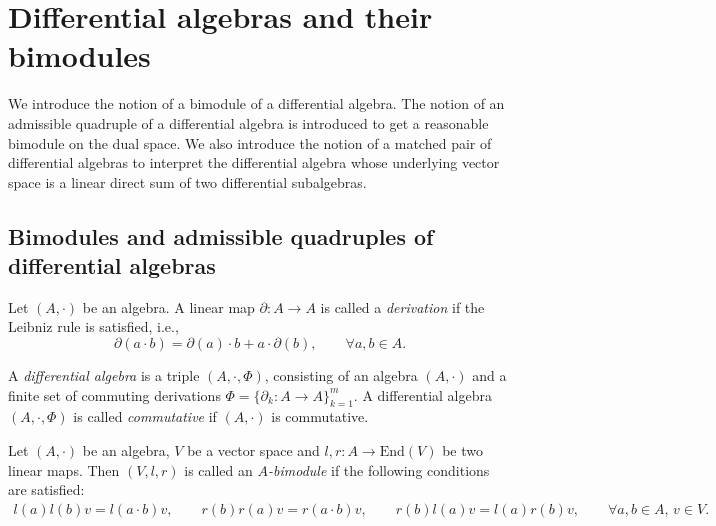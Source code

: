 \documentclass[pdftex]{sigma}
\numberwithin{equation}{section}
\newcommand{\End}{\mathrm{End}}
\begin{document}
\section{Differential algebras and their bimodules}\label{sec:rep}

We introduce the notion of a bimodule of a differential algebra.
The notion of an admissible quadruple of a differential algebra is introduced to get a reasonable bimodule on the dual space.
We also introduce the notion of a matched pair of differential algebras to interpret the differential algebra whose underlying vector space is a linear direct sum of two differential subalgebras.

\subsection{Bimodules and admissible quadruples of differential algebras}

\begin{Definition}\label{def:derivation}
 Let $(A, \cdot)$ be an algebra.
 A linear map $\partial\colon A \to A$ is called a \textit{derivation}
 if the Leibniz rule is satisfied, i.e.,
 \begin{equation}
 \partial(a \cdot b) = \partial(a) \cdot b + a \cdot \partial(b), \qquad
 \forall a, b \in A. \label{eq:derivation}
 \end{equation}
\end{Definition}

\begin{Definition}\label{def:dalg}
 A \textit{differential algebra} is a triple $(A, \cdot, \Phi)$,
 consisting of an algebra $(A, \cdot)$ and a finite set of commuting derivations $\Phi = \{\partial_k\colon A \to A\}^m_{k=1}$.
 A differential algebra $(A, \cdot, \Phi)$ is called \textit{commutative} if $(A, \cdot)$ is commutative.
\end{Definition}

\begin{Definition} Let $(A, \cdot)$ be an algebra, $V$ be a vector space and $l, r\colon A \to \End (V)$ be two linear maps.
 Then $(V, l, r)$ is called an \textit{$A$-bimodule} if the following conditions are satisfied:
 \begin{gather*}
 l(a)l(b)v = l(a \cdot b) v, \qquad\!\!\!
 r(b)r(a)v = r(a \cdot b) v, \qquad\!\!\!
 r(b)l(a)v = l(a)r(b) v, \qquad\!\!\!
 \forall a, b \in A, \, v \in V.\!
 \end{gather*}
\end{Definition}
\end{document}
